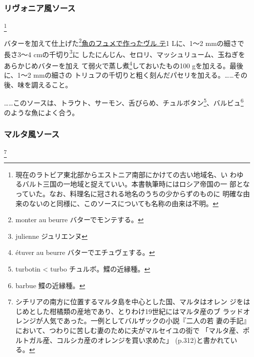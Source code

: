 \begin{recette}
\maeaki

\hypertarget{sauce-livonienne}{%
\subsubsection{リヴォニア風ソース}\label{sauce-livonienne}}

\footnote{現在のラトビア東北部からエストニア南部にかけての古い地域名、い
  わゆるバルト三国の一地域と捉えていい。本書執筆時にはロシア帝国の一
  部となっていた。なお、料理名に冠される地名のうちの少からずのものに
  明確な由来のないのと同様に、このソースについても名称の由来は不明。}


バターを加えて仕上げた\footnote{monter au beurre バターでモンテする。}\protect\hyperlink{veloute-de-poisson}{魚のフュメで作ったヴル
テ}1 Lに、1〜2 mmの細さで長さ3〜4 cmの千切り\footnote{julienne
  ジュリエンヌ}に
したにんじん、セロリ、マッシュリューム、玉ねぎをあらかじめバターを加え
て弱火で蒸し煮\footnote{étuver au beurre バターでエチュヴェする。}しておいたもの100
gを加える。最後に、1〜2 mmの細さの
トリュフの千切りと粗く刻んだパセリを加える。\ldots{}\ldots{}その後、味を調えること。

\ldots{}\ldots{}このソースは、トラウト、サーモン、舌びらめ、チュルボタン\footnote{turbotin
  \textless{} turbo チュルボ。鰈の近縁種。}、バルビュ\footnote{barbue
  鰈の近縁種。}のような魚によく合う。

\maeaki

\hypertarget{sauce-maltaise}{%
\subsubsection{マルタ風ソース}\label{sauce-maltaise}}

\footnote{シチリアの南方に位置するマルタ島を中心とした国、マルタはオレン
  ジをはじめとした柑橘類の産地であり、とりわけ19世紀にはマルタ産のブ
  ラッドオレンジが人気であった。一例としてバルザックの小説『二人の若
  妻の手記』において、つわりに苦しむ妻のために夫がマルセイユの街で
  「マルタ産、ポルトガル産、コルシカ産のオレンジを買い求めた」
  (p.312)と書かれている。}


\end{recette}
